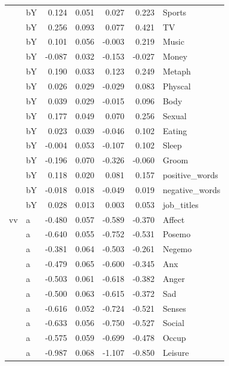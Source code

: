 \documentclass[11pt,a4paper]{article}
\begin{document}
\begin{longtable}{llrrrrl}
   & bY &  0.124 &  0.051 &    0.027 &     0.223 &          Sports \\
   & bY &  0.256 &  0.093 &    0.077 &     0.421 &              TV \\
   & bY &  0.101 &  0.056 &   -0.003 &     0.219 &           Music \\
   & bY & -0.087 &  0.032 &   -0.153 &    -0.027 &           Money \\
   & bY &  0.190 &  0.033 &    0.123 &     0.249 &          Metaph \\
   & bY &  0.026 &  0.029 &   -0.029 &     0.083 &         Physcal \\
   & bY &  0.039 &  0.029 &   -0.015 &     0.096 &            Body \\
   & bY &  0.177 &  0.049 &    0.070 &     0.256 &          Sexual \\
   & bY &  0.023 &  0.039 &   -0.046 &     0.102 &          Eating \\
   & bY & -0.004 &  0.053 &   -0.107 &     0.102 &           Sleep \\
   & bY & -0.196 &  0.070 &   -0.326 &    -0.060 &           Groom \\
   & bY &  0.118 &  0.020 &    0.081 &     0.157 &  positive\_words \\
   & bY & -0.018 &  0.018 &   -0.049 &     0.019 &  negative\_words \\
   & bY &  0.028 &  0.013 &    0.003 &     0.053 &      job\_titles \\
vv & a & -0.480 &  0.057 &   -0.589 &    -0.370 &          Affect \\
   & a & -0.640 &  0.055 &   -0.752 &    -0.531 &          Posemo \\
   & a & -0.381 &  0.064 &   -0.503 &    -0.261 &          Negemo \\
   & a & -0.479 &  0.065 &   -0.600 &    -0.345 &             Anx \\
   & a & -0.503 &  0.061 &   -0.618 &    -0.382 &           Anger \\
   & a & -0.500 &  0.063 &   -0.615 &    -0.372 &             Sad \\
   & a & -0.616 &  0.052 &   -0.724 &    -0.521 &          Senses \\
   & a & -0.633 &  0.056 &   -0.750 &    -0.527 &          Social \\
   & a & -0.575 &  0.059 &   -0.699 &    -0.478 &           Occup \\
   & a & -0.987 &  0.068 &   -1.107 &    -0.850 &         Leisure \\

\end{longtable}
\end{document}
